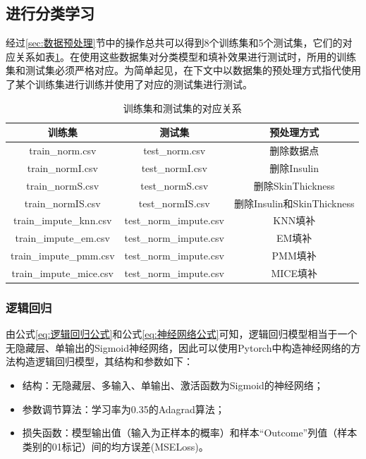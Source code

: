 \documentclass[a4paper]{ctexart}
\begin{document}
\subsection{进行分类学习}
经过\ref{sec:数据预处理}节中的操作总共可以得到8个训练集和5个测试集，它们的对应关系如表\ref{tab:tt对应关系}。在使用这些数据集对分类模型和填补效果进行测试时，所用的训练集和测试集必须严格对应。为简单起见，在下文中以数据集的预处理方式指代使用了某个训练集进行训练并使用了对应的测试集进行测试。
\begin{table}[htbp]
	\centering
	\caption{训练集和测试集的对应关系}\label{tab:数据集表}
	\begin{tabular}{|c|c|c|}
		\hline
		训练集                  & 测试集                 & 预处理方式                 \\
		\hline
		train\_norm.csv         & test\_norm.csv         & 删除数据点                 \\
		\hline
		train\_normI.csv        & test\_normI.csv        & 删除Insulin                \\
		\hline
		train\_normS.csv        & test\_normS.csv        & 删除SkinThickness          \\
		\hline
		train\_normIS.csv       & test\_normIS.csv       & 删除Insulin和SkinThickness \\
		\hline
		train\_impute\_knn.csv  & test\_norm\_impute.csv & KNN填补                    \\
		\hline
		train\_impute\_em.csv   & test\_norm\_impute.csv & EM填补                     \\
		\hline
		train\_impute\_pmm.csv  & test\_norm\_impute.csv & PMM填补                    \\
		\hline
		train\_impute\_mice.csv & test\_norm\_impute.csv & MICE填补                   \\
		\hline
	\end{tabular}
	\label{tab:tt对应关系}
\end{table}

\subsubsection{逻辑回归}\label{sec:进行逻辑回归}
由公式\ref{eq:逻辑回归公式}和公式\ref{eq:神经网络公式}可知，逻辑回归模型相当于一个无隐藏层、单输出的Sigmoid神经网络，因此可以使用Pytorch中构造神经网络的方法构造逻辑回归模型，其结构和参数如下：
\begin{itemize}
	\item 结构：无隐藏层、多输入、单输出、激活函数为Sigmoid的神经网络；
	\item 参数调节算法：学习率为0.35的Adagrad算法；
	\item 损失函数：模型输出值（输入为正样本的概率）和样本“Outcome”列值（样本类别的01标记）间的均方误差(MSELoss)。
\end{itemize}
\end{document}
